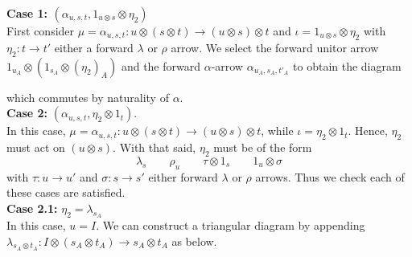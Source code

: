 \begin{varprf}
    \noindent 
    \textbf{Case 1: $(\alpha_{u,s,t}, 1_{u\otimes s} \otimes \eta_2)$}\\
    First consider $\mu = \alpha_{u,s,t}: u\otimes(s\otimes t) \to (u \otimes s)\otimes t$ 
    and $\iota = 1_{u\otimes s} \otimes \eta_2$ with 
    $\eta_2: t \to t'$ either a forward $\lambda$ or $\rho$ arrow.
    We select the forward unitor arrow 
    $1_{u_A}\otimes(1_{s_A} \otimes (\eta_2)_A)$ and the forward 
    $\alpha$-arrow $\alpha_{u_A, s_A, t'_A}$ to obtain the diagram 
    \begin{center}
    \end{center}
    which commutes by naturality of $\alpha$. 
    \\
    \textbf{Case 2:} $(\alpha_{u,s,t}, \eta_2 \otimes 1_t)$.\\
    In this case, $\mu = \alpha_{u,s,t}: u\otimes(s\otimes t) \to (u\otimes s)\otimes t$, 
    while $\iota = \eta_2 \otimes 1_t$. Hence, $\eta_2$ must act on $(u \otimes s)$. 
    With that said, 
    $\eta_2$ must be of the form 
    \[
        \lambda_s \qquad \rho_u \qquad \tau \otimes 1_s \qquad 1_u \otimes \sigma 
    \]
    with $\tau: u \to u'$ and $\sigma: s \to s'$ either forward $\lambda$ or $\rho$ arrows. 
    Thus we check each of these cases are satisfied. 
    \\
    \textbf{Case 2.1:} $\eta_2 = \lambda_{s_A}$\\
    In this case, $u = I$. We can construct a triangular diagram 
    by appending $\lambda_{s_A \otimes t_A}: I \otimes (s_A \otimes t_A) \to s_A \otimes t_A$ as 
    below. 
    \begin{center}
        \begin{tikzcd}[column sep = 1.4cm, row sep = 1cm]

\end{tikzcd}
\end{center}
\end{varprf}
